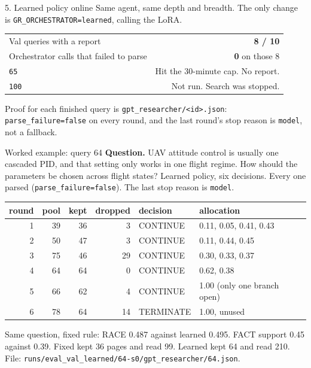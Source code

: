 \documentclass[aspectratio=169,11pt]{beamer}
\begin{document}
\begin{frame}{5. Learned policy online}
  Same agent, same depth and breadth. The only change is \texttt{GR\_ORCHESTRATOR=learned}, calling the LoRA.
  \vspace{0.4em}
  \begin{tabular}{lr}
    \hline
    Val queries with a report & \textbf{8 / 10} \\
    Orchestrator calls that failed to parse & \textbf{0} on those 8 \\
    \texttt{65} & Hit the 30-minute cap. No report. \\
    \texttt{100} & Not run. Search was stopped. \\
    \hline
  \end{tabular}
  \vspace{0.4em}
  Proof for each finished query is \texttt{gpt\_researcher/<id>.json}: \texttt{parse\_failure=false} on every round, and the last round's stop reason is \texttt{model}, not a fallback.
\end{frame}

\begin{frame}{Worked example: query 64}
  \textbf{Question.} UAV attitude control is usually one cascaded PID, and that setting only works in one flight regime. How should the parameters be chosen across flight states?
  \vspace{0.25em}
  Learned policy, six decisions. Every one parsed (\texttt{parse\_failure=false}). The last stop reason is \texttt{model}.
  \vspace{0.2em}
  \small
  \begin{tabular}{rrrrll}
    \hline
    round & pool & kept & dropped & decision & allocation \\
    \hline
    1 & 39 & 36 & 3 & CONTINUE & 0.11, 0.05, 0.41, 0.43 \\
    2 & 50 & 47 & 3 & CONTINUE & 0.11, 0.44, 0.45 \\
    3 & 75 & 46 & 29 & CONTINUE & 0.30, 0.33, 0.37 \\
    4 & 64 & 64 & 0 & CONTINUE & 0.62, 0.38 \\
    5 & 66 & 62 & 4 & CONTINUE & 1.00 (only one branch open) \\
    6 & 78 & 64 & 14 & TERMINATE & 1.00, unused \\
    \hline
  \end{tabular}
  \vspace{0.3em}
  \normalsize
  Same question, fixed rule: RACE 0.487 against learned 0.495. FACT support 0.45 against 0.39. Fixed kept 36 pages and read 99. Learned kept 64 and read 210.
  \vspace{0.2em}
  {\small File: \texttt{runs/eval\_val\_learned/64-s0/gpt\_researcher/64.json}.}
\end{frame}
\end{document}

